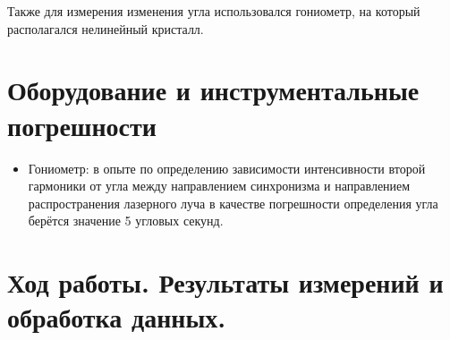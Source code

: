 \documentclass[a4paper,12pt]{article} %
\begin{document}
Также для измерения изменения угла использовался гониометр, на который располагался нелинейный кристалл.

\section{Оборудование и инструментальные погрешности}

\begin{itemize}
\item Гониометр: в опыте по определению зависимости интенсивности второй гармоники от угла между направлением синхронизма и направлением распространения лазерного луча в качестве погрешности определения угла берётся значение 5 угловых секунд.
\end{itemize}
\section{Ход работы. Результаты измерений и обработка данных.}
\end{document}
